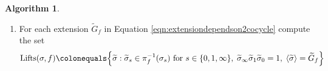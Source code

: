 \documentclass{dcthesis}
\newcommand{\ZZ}{\mathbb Z}
\newcommand{\mm}[1]{{\color{blue} \sf MM: [#1]}}
\newcommand{\wt}[1]{\widetilde{#1}}
\DeclareMathOperator{\Lifts}{Lifts}
\DeclareMathOperator{\order}{order}
\numberwithin{equation}{section}
\theoremstyle{definition}
\newtheorem{alg}[equation]{Algorithm}
\theoremstyle{remark}
\begin{document}
{{\begin{alg}
\begin{enumerate}
        \item
          \label{alg:triplescomputelifts}
          For each extension
          $\wt{G}_f$ in Equation
          \ref{eqn:extensiondependson2cocycle}
          compute the set
          \begin{equation}
            \label{eqn:lifts}
            \Lifts(\sigma, f)
            \colonequals
            \Big\{
              \wt{\sigma}
              :
              \wt{\sigma}_s\in\pi_f^{-1}
              (\sigma_s)\text{ for }
              s\in\{0,1,\infty\},\;
              \wt{\sigma}_\infty
              \wt{\sigma}_1
              \wt{\sigma}_0=1,\;
              \langle\wt{\sigma}\rangle
              =\wt{G}_f
            \Big\}
          \end{equation}

\end{enumerate}
\end{alg}}}
\end{document}
